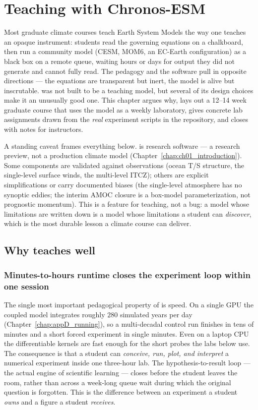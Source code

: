\chapter{Teaching with Chronos-ESM}\label{chap:ch21_teaching}

\providecommand{\labweek}[1]{\textbf{Week #1}}

Most graduate climate courses teach Earth System Models the way one teaches an opaque
instrument: students read the governing equations on a chalkboard, then run a community model
(CESM, MOM6, an EC-Earth configuration) as a black box on a remote queue, waiting hours or days
for output they did not generate and cannot fully read. The pedagogy and the software pull in
opposite directions --- the equations are transparent but inert, the model is alive but
inscrutable. \model{} was not built to be a teaching model, but several of its design choices
make it an unusually good one. This chapter argues why, lays out a 12--14 week graduate course
that uses the model as a weekly laboratory, gives concrete lab assignments drawn from the
\emph{real} experiment scripts in the repository, and closes with notes for instructors.

A standing caveat frames everything below. \model{} is research software --- a research preview,
not a production climate model (Chapter~\ref{chap:ch01_introduction}). Some components are
validated against observations (ocean T/S structure, the single-level surface winds, the
multi-level ITCZ); others are explicit simplifications or carry documented biases (the
single-level atmosphere has no synoptic eddies; the interim AMOC closure is a box-model
parameterization, not prognostic momentum). This is a feature for teaching, not a bug: a model
whose limitations are written down is a model whose limitations a student can \emph{discover},
which is the most durable lesson a climate course can deliver.

\section{Why \model{} teaches well}

\subsection{Minutes-to-hours runtime closes the experiment loop within one session}

The single most important pedagogical property of \model{} is speed. On a single GPU the coupled
model integrates roughly $280$ simulated years per day (Chapter~\ref{chap:appD_running}), so a
multi-decadal control run finishes in tens of minutes and a short forced experiment in single
minutes. Even on a laptop CPU the differentiable kernels are fast enough for the short probes the
labs below use. The consequence is that a student can \emph{conceive, run, plot, and interpret} a
numerical experiment inside one three-hour lab. The hypothesis-to-result loop --- the actual
engine of scientific learning --- closes before the student leaves the room, rather than across a
week-long queue wait during which the original question is forgotten. This is the difference
between an experiment a student \emph{owns} and a figure a student \emph{receives}.

